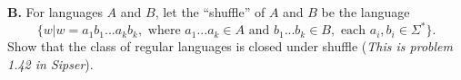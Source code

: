 \documentclass[10pt]{article}
\begin{document}

\newpage

\noindent
\textbf{B.} For languages $A$ and $B$, let the ``shuffle'' of $A$ and $B$ be the language
\[\{w|w=a_1b_1...a_kb_k,\text{ where }a_1...a_k\in A\text{ and }b_1...b_k\in B, \text{ each }a_i,b_i\in\Sigma^*\}.\]
Show that the class of regular languages is closed under shuffle (\textit{This is problem 1.42 in Sipser}).\\



\end{document}
